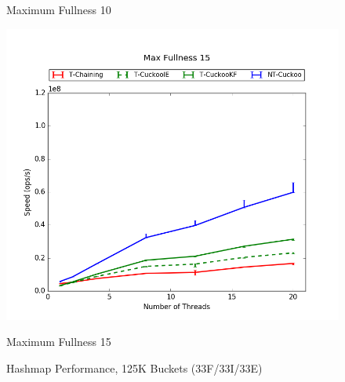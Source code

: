 \begin{figure}[H]
\begin{minipage}{0.45\textwidth}
        \caption*{Maximum Fullness 10}
    \end{minipage}
	\begin{minipage}{0.45\textwidth}\includegraphics[width=\textwidth]{maps/15HM125K:F34,I33,E33.png} 
        \caption*{Maximum Fullness 15}
    \end{minipage}
	\caption{Hashmap Performance, 125K Buckets (33F/33I/33E)}
\end{figure}
